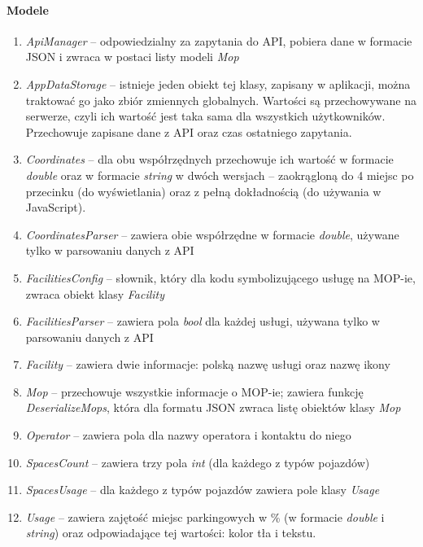 \paragraph{Modele}
\begin{enumerate}
\item \textit{ApiManager} -- odpowiedzialny za zapytania do API, pobiera dane w formacie JSON i zwraca w postaci listy modeli \textit{Mop}
\item \textit{AppDataStorage} -- istnieje jeden obiekt tej klasy, zapisany w aplikacji, można traktować go jako zbiór zmiennych globalnych. Wartości są przechowywane na serwerze, czyli ich wartość jest taka sama dla wszystkich użytkowników. Przechowuje zapisane dane z API oraz czas ostatniego zapytania.
\item \textit{Coordinates} -- dla obu współrzędnych przechowuje ich wartość w formacie \textit{double} oraz w formacie \textit{string} w dwóch wersjach -- zaokrągloną do 4 miejsc po przecinku (do wyświetlania) oraz z pełną dokładnością (do używania w JavaScript). 
\item \textit{CoordinatesParser} -- zawiera obie współrzędne w formacie \textit{double}, używane tylko w parsowaniu danych z API
\item \textit{FacilitiesConfig} -- słownik, który dla kodu symbolizującego usługę na MOP-ie, zwraca obiekt klasy \textit{Facility}
\item \textit{FacilitiesParser} -- zawiera pola \textit{bool} dla każdej usługi, używana tylko w parsowaniu danych z API
\item \textit{Facility} -- zawiera dwie informacje: polską nazwę usługi oraz nazwę ikony
\item \textit{Mop} -- przechowuje wszystkie informacje o MOP-ie; zawiera funkcję \textit{DeserializeMops}, która dla formatu JSON zwraca listę obiektów klasy \textit{Mop}
\item \textit{Operator} -- zawiera pola dla nazwy operatora i kontaktu do niego
\item \textit{SpacesCount} -- zawiera trzy pola \textit{int} (dla każdego z typów pojazdów)
\item \textit{SpacesUsage} -- dla każdego z typów pojazdów zawiera pole klasy \textit{Usage}
\item \textit{Usage} -- zawiera zajętość miejsc parkingowych w \% (w formacie \textit{double} i \textit{string}) oraz odpowiadające tej wartości: kolor tła i tekstu.
\end{enumerate}

